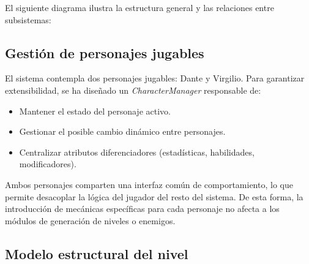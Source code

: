 El siguiente diagrama ilustra la estructura general y las relaciones entre subsistemas:

\begin{center}
\end{center}

\subsection{Gestión de personajes jugables}

El sistema contempla dos personajes jugables: Dante y Virgilio. Para garantizar extensibilidad, se ha diseñado un \textit{CharacterManager} responsable de:

\begin{itemize}
    \item Mantener el estado del personaje activo.
    \item Gestionar el posible cambio dinámico entre personajes.
    \item Centralizar atributos diferenciadores (estadísticas, habilidades, modificadores).
\end{itemize}

Ambos personajes comparten una interfaz común de comportamiento, lo que permite desacoplar la lógica del jugador del resto del sistema. De esta forma, la introducción de mecánicas específicas para cada personaje no afecta a los módulos de generación de niveles o enemigos.

\subsection{Modelo estructural del nivel}

